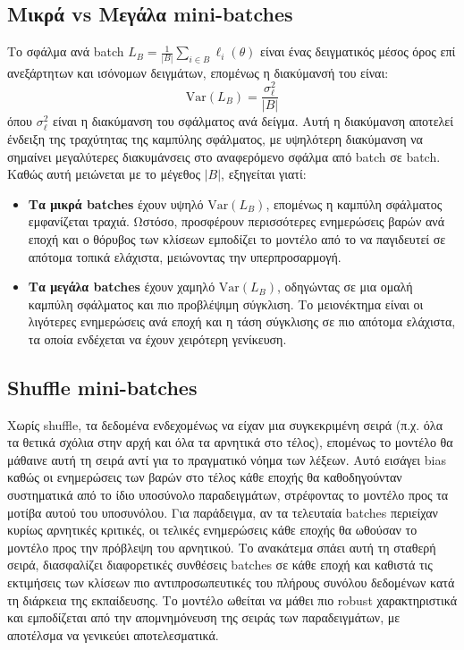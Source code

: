 \documentclass[12pt]{article}
\begin{document}
\subsection*{Μικρά vs Μεγάλα mini-batches}

Το σφάλμα ανά batch $L_B = \frac{1}{|B|}\sum_{i \in B} \ell_i(\theta)$ είναι ένας δειγματικός μέσος όρος επί ανεξάρτητων και ισόνομων δειγμάτων, επομένως η διακύμανσή του είναι:
\[
    \mathrm{Var}(L_B) = \frac{\sigma_\ell^2}{|B|}
\]
όπου $\sigma_\ell^2$ είναι η διακύμανση του σφάλματος ανά δείγμα. Αυτή η διακύμανση αποτελεί ένδειξη της τραχύτητας της καμπύλης σφάλματος, με υψηλότερη διακύμανση να σημαίνει μεγαλύτερες διακυμάνσεις στο αναφερόμενο σφάλμα από batch σε batch. Καθώς αυτή μειώνεται με το μέγεθος $|B|$, εξηγείται γιατί:

\begin{itemize}
    \item \textbf{Τα μικρά batches} έχουν υψηλό $\mathrm{Var}(L_B)$, επομένως η καμπύλη σφάλματος εμφανίζεται τραχιά. Ωστόσο, προσφέρουν περισσότερες ενημερώσεις βαρών ανά εποχή και ο θόρυβος των κλίσεων εμποδίζει το μοντέλο από το να παγιδευτεί σε απότομα τοπικά ελάχιστα, μειώνοντας την υπερπροσαρμογή.

    \item \textbf{Τα μεγάλα batches} έχουν χαμηλό $\mathrm{Var}(L_B)$, οδηγώντας σε μια ομαλή καμπύλη σφάλματος και πιο προβλέψιμη σύγκλιση. Το μειονέκτημα είναι οι λιγότερες ενημερώσεις ανά εποχή και η τάση σύγκλισης σε πιο απότομα ελάχιστα, τα οποία ενδέχεται να έχουν χειρότερη γενίκευση.
\end{itemize}

\subsection*{Shuffle mini-batches}

Χωρίς shuffle, τα δεδομένα ενδεχομένως να είχαν μια συγκεκριμένη σειρά (π.χ. όλα τα θετικά σχόλια στην αρχή και όλα τα αρνητικά στο τέλος), επομένως το μοντέλο θα μάθαινε αυτή τη σειρά αντί για το πραγματικό νόημα των λέξεων. Αυτό εισάγει bias καθώς οι ενημερώσεις των βαρών στο τέλος κάθε εποχής θα καθοδηγούνταν συστηματικά από το ίδιο υποσύνολο παραδειγμάτων, στρέφοντας το μοντέλο προς τα μοτίβα αυτού του υποσυνόλου. Για παράδειγμα, αν τα τελευταία batches περιείχαν κυρίως αρνητικές κριτικές, οι τελικές ενημερώσεις κάθε εποχής θα ωθούσαν το μοντέλο προς την πρόβλεψη του αρνητικού. Το ανακάτεμα σπάει αυτή τη σταθερή σειρά, διασφαλίζει διαφορετικές συνθέσεις batches σε κάθε εποχή και καθιστά τις εκτιμήσεις των κλίσεων πιο αντιπροσωπευτικές του πλήρους συνόλου δεδομένων κατά τη διάρκεια της εκπαίδευσης. Το μοντέλο ωθείται να μάθει πιο robust χαρακτηριστικά και εμποδίζεται από την απομνημόνευση της σειράς των παραδειγμάτων, με αποτέλσμα να γενικεύει αποτελεσματικά.
\end{document}
